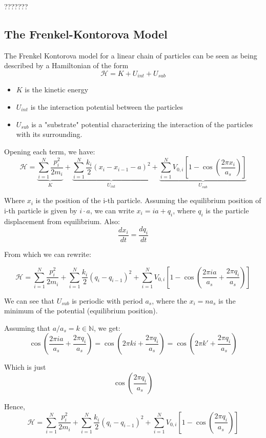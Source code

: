 ???????

\subsection{The Frenkel-Kontorova Model}

The Frenkel Kontorova model for a linear chain of particles can be seen as being described by a Hamiltonian of the form 
\[ \mathcal{H} = K + U_{int} + U_{sub} \]

\begin{itemize}
	\item $ K $ is the kinetic energy
	\item $ U_{int} $ is the interaction potential between the particles
	\item $ U_{sub} $ is a "substrate" potential characterizing the interaction of the particles with its surrounding.
\end{itemize}

Opening each term, we have:
\[ 
\mathcal{H} = \underbrace{\sum_{i=1}^{N}\frac{p_{i}^{2}}{2m_i}}_{K} + 
\underbrace{\sum_{i=1}^{N} \frac{k_i}{2}(x_{i} - x_{i-1} - a)^{2}}_{U_{int}} +
\underbrace{\sum_{i=1}^{N} V_{0,i}\left[1 - \cos \left( \frac{2\pi x_{i}}{a_{s}}\right)\right]}_{U_{sub}}
\]

Where $ x_i $ is the position of the i-th particle. Assuming the equilibrium position of i-th particle is given by $ i\cdot a $, we can write $ x_i = ia + q_{i}$, where $ q_{i} $ is the particle displacement from equilibrium. Also:
\[ \frac{dx_{i}}{dt} =  \frac{dq_{i}}{dt}\]

From which we can rewrite:

\[ 
\mathcal{H} = \sum_{i=1}^{N}\frac{p_{i}^{2}}{2m_i} + 
\sum_{i=1}^{N} \frac{k_i}{2}(q_{i} - q_{i-1})^{2} +
\sum_{i=1}^{N} V_{0,i}\left[1 - 
\cos \left( \frac{2\pi i a}{a_{s}} + \frac{2\pi q_{i}}{a_{s}}\right)\right]
\]

We can see that $ U_{sub} $ is periodic with period $ a_s $, where the $ x_i = n a_s $ is the minimum of the potential (equilibrium position).

Assuming that $ a/a_s = k\in \mathbb{N} $, we get:
\[ 
\cos \left( \frac{2\pi i a}{a_{s}} + \frac{2\pi q_{i}}{a_{s}}\right) = 
\cos \left( 2\pi k i  + \frac{2\pi q_{i}}{a_{s}}\right) = 
\cos \left( 2\pi k'  + \frac{2\pi q_{i}}{a_{s}}\right)
\]

Which is just
\[ \cos \left( \frac{2\pi q_{i}}{a_{s}}\right) \]

Hence, 
\[ 
\mathcal{H} = \sum_{i=1}^{N}\frac{p_{i}^{2}}{2m_i} + 
\sum_{i=1}^{N} \frac{k_i}{2}(q_{i} - q_{i-1})^{2} +
\sum_{i=1}^{N} V_{0,i}\left[1 - 
\cos \left( \frac{2\pi q_{i}}{a_{s}}\right)\right]
\]


